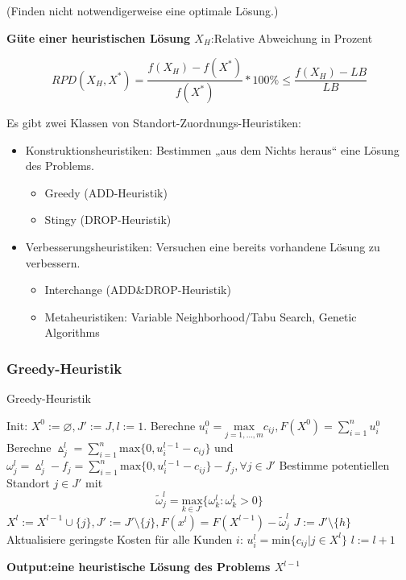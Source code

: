       (Finden nicht notwendigerweise eine optimale Lösung.)

      \par \textbf{Güte einer heuristischen Lösung $X_H$}:Relative Abweichung in Prozent

      $$
        RPD(X_H, X^*) = \frac{f(X_H) - f(X^*)}{f(X^*)} * 100\% \leq \frac{f(X_H) - LB}{LB}
      $$

      \par Es gibt zwei Klassen von Standort-Zuordnungs-Heuristiken:
      \begin{itemize}
        \item Konstruktionsheuristiken: Bestimmen „aus dem Nichts heraus“ eine Lösung des Problems. 
        \begin{itemize}
          \item Greedy (ADD-Heuristik)
          \item Stingy (DROP-Heuristik)
        \end{itemize}
        \item Verbesserungsheuristiken: Versuchen eine bereits vorhandene Lösung zu verbessern.
        \begin{itemize}
          \item Interchange (ADD\&DROP-Heuristik)
          \item Metaheuristiken: Variable Neighborhood/Tabu Search, Genetic Algorithms
        \end{itemize}
      \end{itemize}

      \subsubsection{Greedy-Heuristik}

        \begin{algorithm}[H]
          \begin{algorithmic}[1]
            \caption{Greedy-Heuristik}
            \State Init: $X^0:=\varnothing, J':= J, l:=1$. Berechne $u_i^0 = \underset{j=1,\dots, m}{\text{max}}c_{ij}, F(X^0)=\sum_{i=1}^{n}u_i^0$
              \State Berechne $\vartriangle_j^l = \sum_{i=1}^{n}\text{max}\{0, u_i^{l-1} -c_{ij}\}$ und $\omega_j^l = \vartriangle_j^l - f_j = \sum_{i=1}^{n}\text{max}\{0, u_i^{l-1} -c_{ij}\} - f_j, \forall j \in J'$
              \State Bestimme potentiellen Standort $j \in J'$ mit $$\tilde{\omega}_j^l = \underset{k \in J'}{\text{max}}\{\omega_k^l: \omega_k^l > 0\}$$
              \State $X^l := X^{l-1} \cup \{j\}, J':= J'\setminus\{j\}, F(x^l) = F(X^{l-1}) - \tilde{\omega}_j^l$
                \State $J:= J' \setminus \{h\}$
              \EndIf
              \State Aktualisiere geringste Kosten für alle Kunden $i$: $u_i^l = \text{min}\{c_{ij} | j \in X^l\}$
              \State $l:= l+1$
            \EndWhile
            \end{algorithmic}
          \textbf{Output:eine heuristische Lösung des Problems $X^{l-1}$} 
        \end{algorithm}

